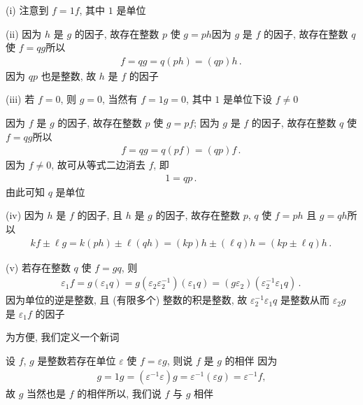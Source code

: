 \begin{pf}
    (i) 注意到 $f = 1f$, 其中 $1$ 是单位\period

    (ii) 因为 $h$ 是 $g$ 的因子, 故存在整数 $p$ 使 $g = ph$\period 因为 $g$ 是 $f$ 的因子, 故存在整数 $q$ 使 $f = qg$\period 所以
    \begin{align*}
        f = qg = q(ph) = (qp)h \period
    \end{align*}
    因为 $qp$ 也是整数, 故 $h$ 是 $f$ 的因子\period

    (iii) 若 $f = 0$, 则 $g = 0$, 当然有 $f = 1 g = 0$, 其中 $1$ 是单位\period 下设 $f \neq 0$\period

    因为 $f$ 是 $g$ 的因子, 故存在整数 $p$ 使 $g = pf$; 因为 $g$ 是 $f$ 的因子, 故存在整数 $q$ 使 $f = qg$\period 所以
    \begin{align*}
        f = qg = q(pf) = (qp)f \period
    \end{align*}
    因为 $f \neq 0$, 故可从等式二边消去 $f$, 即
    \begin{align*}
        1 = qp \period
    \end{align*}
    由此可知 $q$ 是单位\period

    (iv) 因为 $h$ 是 $f$ 的因子, 且 $h$ 是 $g$ 的因子, 故存在整数 $p$, $q$ 使 $f = ph$ 且 $g = qh$\period 所以
    \begin{align*}
        kf \pm \ell g = k(ph) \pm \ell (qh) = (kp) h \pm (\ell q) h = (kp \pm \ell q) h \period
    \end{align*}

    (v) 若存在整数 $q$ 使 $f = gq$, 则
    \begin{align*}
        \varepsilon_1 f = g(\varepsilon_1 q) = g(\varepsilon_2 \varepsilon_2^{-1}) (\varepsilon_1 q) = (g\varepsilon_2) (\varepsilon_2^{-1} \varepsilon_1 q) \period
    \end{align*}
    因为单位的逆是整数, 且 (有限多个) 整数的积是整数, 故 $\varepsilon_2^{-1} \varepsilon_1 q$ 是整数\period 从而 $\varepsilon_2 g$ 是 $\varepsilon_1 f$ 的因子\period
\end{pf}

为方便, 我们定义一个新词\period

\begin{definition}
    设 $f$, $g$ 是整数\period 若存在单位 $\varepsilon$ 使 $f = \varepsilon g$, 则说 $f$ 是 $g$ 的相伴 \period 因为
    \begin{align*}
        g = 1g = (\varepsilon^{-1} \varepsilon) g = \varepsilon^{-1} (\varepsilon g) = \varepsilon^{-1} f,
    \end{align*}
    故 $g$ 当然也是 $f$ 的相伴\period 所以, 我们说 $f$ 与 $g$ 相伴 \period
\end{definition}

